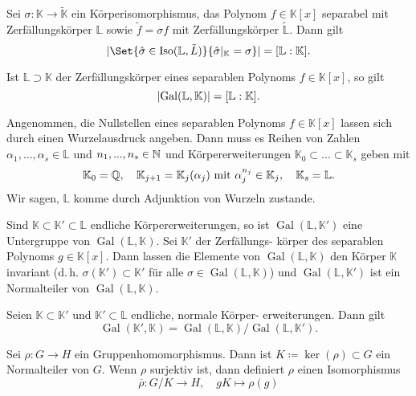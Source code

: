\documentclass{cheat-sheet}
\newcommand{\K}{\mathbb{K}} %
\renewcommand{\L}{\mathbb{L}} %
\DeclareMathOperator{\Iso}{Iso} %
\DeclareMathOperator{\Gal}{Gal} %
\begin{document}

\begin{satz}
  Sei $\sigma : \K \to \tilde{\K}$ ein Körperisomorphismus, das Polynom $f \in \K[x]$ separabel mit Zerfällungskörper $\L$ sowie $\tilde{f} = \sigma f$ mit Zerfällungskörper $\tilde{\L}$. Dann gilt
  \[ \abs{\Set{ \hat{\sigma} \in \Iso(\L, \tilde{L}) }{ \hat{\sigma}|_{\K} = \sigma }} = [\L : \K]. \]
\end{satz}

\begin{kor}
  Ist $\L \supset \K$ der Zerfällungskörper eines separablen Polynoms $f \in \K[x]$, so gilt
  \[ \abs{\Gal(\L, \K)} = [\L : \K]. \]
\end{kor}



\begin{bem}
  Angenommen, die Nullstellen eines separablen Polynoms $f \in \K[x]$ lassen sich durch einen Wurzelausdruck angeben. Dann muss es Reihen von Zahlen $\alpha_1, ..., \alpha_s \in \L$ und $n_1, ..., n_s \in \mathbb{N}$ und Körpererweiterungen $\K_0 \subset ... \subset \K_s$ geben mit
  \[
    \K_0 = \Q, \quad
    \K_{j+1} = \K_j(\alpha_j) \text{ mit } \alpha_j^{n_j} \in \K_j, \quad
    \K_s = \L.
  \]
  Wir sagen, $\L$ komme durch Adjunktion von Wurzeln zustande.
\end{bem}

\begin{lem}
  Sind $\K \subset \K' \subset \L$ endliche Körpererweiterungen, so ist $\Gal(\L, \K')$ eine Untergruppe von $\Gal(\L, \K)$. Sei $\K'$ der Zerfällungs- körper des separablen Polynoms $g \in \K[x]$. Dann lassen die Elemente von $\Gal(\L, \K)$ den Körper $\K$ invariant (d.\,h. $\sigma(\K') \subset \K'$ für alle $\sigma \in \Gal(\L, \K)$) und $\Gal(\L, \K')$ ist ein Normalteiler von $\Gal(\L, \K)$.
\end{lem}

\begin{lem}
  Seien $\K \subset \K'$ und $\K' \subset \L$ endliche, normale Körper- erweiterungen. Dann gilt
  \[ \Gal(\K', \K) = \Gal(\L, \K) / \Gal(\L, \K'). \]
\end{lem}

\begin{lem}
  Sei $\rho : G \to H$ ein Gruppenhomomorphismus. Dann ist $K \coloneqq \ker(\rho) \subset G$ ein Normalteiler von $G$. Wenn $\rho$ surjektiv ist, dann definiert $\rho$ einen Isomorphismus
  \[ \overline{\rho} : G / K \to H, \quad gK \mapsto \rho(g) \]
\end{lem}
\end{document}
